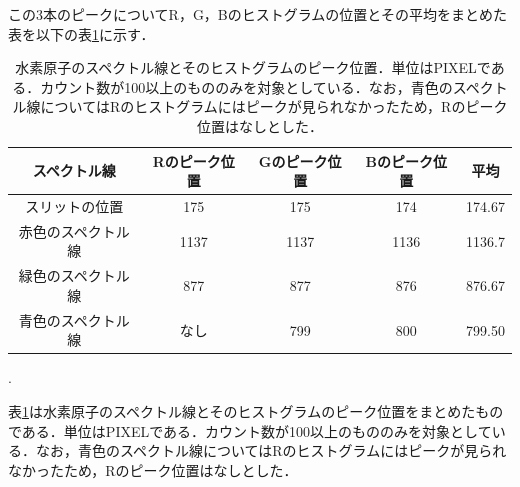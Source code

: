 \documentclass[a4paper,dvipdfmx,10.5pt]{jarticle}
\begin{document}
この3本のピークについてR，G，Bのヒストグラムの位置とその平均をまとめた表を以下の表\ref{tab:H_spectrum}に示す．
\begin{table}[htbp]
 \begin{center}
  \begin{tabular}{|c|c|c|c|c|}
    \hline
   スペクトル線 & Rのピーク位置 & Gのピーク位置 & Bのピーク位置& 平均 \\
    \hline
    スリットの位置 & 175 & 175 & 174 & 174.67 \\
   赤色のスペクトル線 & 1137 & 1137 & 1136 & 1136.7 \\
   緑色のスペクトル線 & 877 & 877 & 876 & 876.67 \\
   青色のスペクトル線 & なし & 799 & 800 & 799.50 \\
   \hline
  \end{tabular}
  \caption{水素原子のスペクトル線とそのヒストグラムのピーク位置．単位はPIXELである．カウント数が100以上のもののみを対象としている．なお，青色のスペクトル線についてはRのヒストグラムにはピークが見られなかったため，Rのピーク位置はなしとした．}
  .\label{tab:H_spectrum}
 \end{center}
\end{table}
表\ref{tab:H_spectrum}は水素原子のスペクトル線とそのヒストグラムのピーク位置をまとめたものである．単位はPIXELである．カウント数が100以上のもののみを対象としている．なお，青色のスペクトル線についてはRのヒストグラムにはピークが見られなかったため，Rのピーク位置はなしとした．
\end{document}
